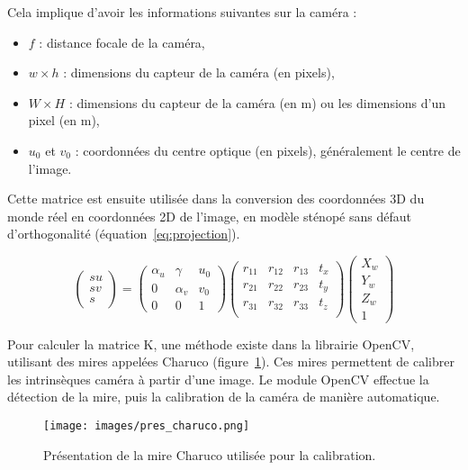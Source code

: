 \documentclass[12pt]{article}
\begin{document}
Cela implique d'avoir les informations suivantes sur la caméra :
\begin{itemize}
    \item $f$ : distance focale de la caméra,
    \item $w \times h$ : dimensions du capteur de la caméra (en pixels),
    \item $W \times H$ : dimensions du capteur de la caméra (en m) ou les dimensions d'un pixel (en m),
    \item $u_0$ et $v_0$ : coordonnées du centre optique (en pixels), généralement le centre de l'image.
\end{itemize}
\vspace{1cm}

Cette matrice est ensuite utilisée dans la conversion des coordonnées 3D du monde réel en coordonnées 2D de l'image, 
en modèle sténopé sans défaut d'orthogonalité (équation~\ref{eq:projection}).

\begin{equation}
\label{eq:projection}
\begin{pmatrix}
su \\
sv \\
s
\end{pmatrix} = 
\begin{pmatrix}
\alpha_{u} & \gamma & u_0 \\
0 & \alpha_{v} & v_0 \\
0 & 0 & 1
\end{pmatrix}
\begin{pmatrix}
r_{11} & r_{12} & r_{13} & t_x \\
r_{21} & r_{22} & r_{23} & t_y \\
r_{31} & r_{32} & r_{33} & t_z \\
\end{pmatrix}
\begin{pmatrix}
X_w \\
Y_w \\
Z_w \\
1
\end{pmatrix}
\end{equation}

Pour calculer la matrice K, une méthode existe dans la librairie OpenCV, utilisant des mires appelées Charuco (figure~\ref{fig:charuco}).
Ces mires permettent de calibrer les intrinsèques caméra à partir d'une image.
Le module OpenCV effectue la détection de la mire, puis la calibration de la caméra de manière automatique.

\begin{figure}[H]
\centering
\texttt{[image: images/pres\_charuco.png]}
\caption{Présentation de la mire Charuco utilisée pour la calibration.}
\label{fig:charuco}
\end{figure}
\end{document}
